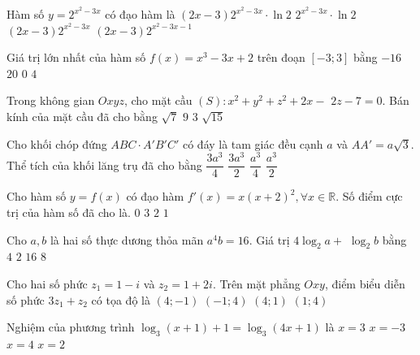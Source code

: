 \begin{ex}%
Hàm số $y=2^{x^2-3 x}$ có đạo hàm là
\choice
{\True $(2 x-3) 2^{x^2-3 x} \cdot \ln 2$}
{$2^{x^2-3 x} \cdot \ln 2$}
{$(2 x-3) 2^{x^2-3 x}$}
{$(2 x-3) 2^{x^2-3 x-1}$}

\end{ex}
\begin{ex}%
Giá trị lớn nhất của hàm số $f(x)=x^3-3 x+2$ trên đoạn $[-3; 3]$ bằng
\choice
{$-16$}
{\True $20$}
{$0$}
{$4$}

\end{ex}
\begin{ex}%
Trong không gian $O x y z$, cho mặt cầu $(S)\colon x^2+y^2+z^2+2 x-$ $2 z-7=0$. Bán kính của mặt cầu đã cho bằng
\choice
{$\sqrt{7}$}
{$9$}
{\True $3$}
{$\sqrt{15}$}

\end{ex}
\begin{ex}%
Cho khối chóp đứng $ABC \cdot A'B'C'$ có đáy là tam giác đều cạnh $a$ và $AA'=a \sqrt{3}$. Thể tích của khối lăng trụ đã cho bằng
\choice
{\True $\dfrac{3 a^3}{4}$}
{$\dfrac{3 a^3}{2}$}
{$\dfrac{a^3}{4}$}
{$\dfrac{a^3}{2}$}

\end{ex}
\begin{ex}%
Cho hàm số $y=f(x)$ có đạo hàm $f'(x)=x(x+2)^2, \forall x \in \mathbb{R}$. Số điểm cực trị của hàm số đã cho là.
\choice
{$0$}
{$3$}
{$2$}
{\True $1$}

\end{ex}
\begin{ex}%
Cho $a, b$ là hai số thực dương thỏa mãn $a^4 b=16$. Giá trị $4\log_2 a+$ $\log_2 b$ bằng
\choice
{\True $4$}
{$2$}
{$16$}
{$8$}

\end{ex}
\begin{ex}%
Cho hai số phức $z_1=1-i$ và $z_2=1+2 i$. Trên mặt phẳng $O x y$, điểm biểu diễn số phức $3 z_1+z_2$ có tọa độ là
\choice
{\True $(4;-1)$}
{$(-1; 4)$}
{$(4; 1)$}
{$(1; 4)$}

\end{ex}
\begin{ex}%
Nghiệm của phương trình $\log_3(x+1)+1=\log_3(4 x+1)$ là
\choice
{$x=3$}
{$x=-3$}
{$x=4$}
{\True $x=2$}

\end{ex}

